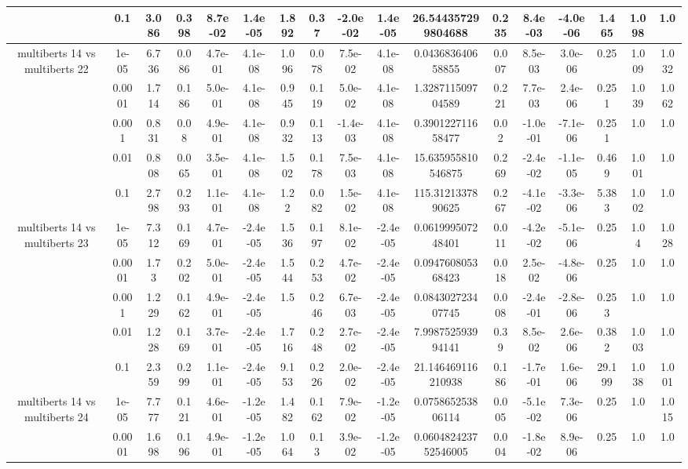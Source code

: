 \begin{tabular}{|c|c|c|c|c|c|c|c|c|c|c|c|c|c|c|c|c|}
 & 0.1 & 3.086 & 0.398 & 8.7e-02 & 1.4e-05 & 1.892 & 0.37 & -2.0e-02 & 1.4e-05 & 26.544357299804688 & 0.235 & 8.4e-03 & -4.0e-06 & 1.465 & 1.098 & 1.0 \\
\hline
\multirow{5}{*}{multiberts 14 vs multiberts 22} & 1e-05 & 6.736 & 0.086 & 4.7e-01 & 4.1e-08 & 1.096 & 0.078 & 7.5e-02 & 4.1e-08 & 0.043683640658855 & 0.007 & 8.5e-03 & 3.0e-06 & 0.25 & 1.009 & 1.032 \\
 & 0.0001 & 1.714 & 0.186 & 5.0e-01 & 4.1e-08 & 0.945 & 0.119 & 5.0e-02 & 4.1e-08 & 1.328711509704589 & 0.221 & 7.7e-03 & 2.4e-06 & 0.251 & 1.039 & 1.062 \\
 & 0.001 & 0.831 & 0.08 & 4.9e-01 & 4.1e-08 & 0.932 & 0.113 & -1.4e-03 & 4.1e-08 & 0.390122711658477 & 0.02 & -1.0e-01 & -7.1e-06 & 0.251 & 1.0 & 1.0 \\
 & 0.01 & 0.808 & 0.065 & 3.5e-01 & 4.1e-08 & 1.502 & 0.178 & 7.5e-03 & 4.1e-08 & 15.635955810546875 & 0.269 & -2.4e-02 & -1.1e-05 & 0.469 & 1.001 & 1.0 \\
 & 0.1 & 2.798 & 0.293 & 1.1e-01 & 4.1e-08 & 1.22 & 0.082 & 1.5e-02 & 4.1e-08 & 115.3121337890625 & 0.267 & -4.1e-02 & -3.3e-06 & 5.383 & 1.002 & 1.0 \\
\hline
\multirow{5}{*}{multiberts 14 vs multiberts 23} & 1e-05 & 7.312 & 0.169 & 4.7e-01 & -2.4e-05 & 1.536 & 0.197 & 8.1e-02 & -2.4e-05 & 0.061999507248401 & 0.011 & -4.2e-02 & -5.1e-06 & 0.25 & 1.04 & 1.028 \\
 & 0.0001 & 1.73 & 0.202 & 5.0e-01 & -2.4e-05 & 1.544 & 0.253 & 4.7e-02 & -2.4e-05 & 0.094760805368423 & 0.018 & 2.5e-02 & -4.8e-06 & 0.25 & 1.0 & 1.0 \\
 & 0.001 & 1.229 & 0.162 & 4.9e-01 & -2.4e-05 & 1.5 & 0.246 & 6.7e-03 & -2.4e-05 & 0.084302723407745 & 0.008 & -2.4e-01 & -2.8e-06 & 0.253 & 1.0 & 1.0 \\
 & 0.01 & 1.228 & 0.169 & 3.7e-01 & -2.4e-05 & 1.716 & 0.248 & 2.7e-02 & -2.4e-05 & 7.998752593994141 & 0.39 & 8.5e-02 & 2.6e-06 & 0.382 & 1.003 & 1.0 \\
 & 0.1 & 2.359 & 0.299 & 1.1e-01 & -2.4e-05 & 9.153 & 0.226 & 2.0e-02 & -2.4e-05 & 21.146469116210938 & 0.186 & -1.7e-01 & 1.6e-06 & 29.199 & 1.038 & 1.001 \\
\hline
\multirow{5}{*}{multiberts 14 vs multiberts 24} & 1e-05 & 7.777 & 0.121 & 4.6e-01 & -1.2e-05 & 1.482 & 0.162 & 7.9e-02 & -1.2e-05 & 0.075865253806114 & 0.005 & -5.1e-02 & 7.3e-06 & 0.25 & 1.0 & 1.015 \\
 & 0.0001 & 1.698 & 0.196 & 4.9e-01 & -1.2e-05 & 1.064 & 0.13 & 3.9e-02 & -1.2e-05 & 0.060482423752546005 & 0.004 & -1.8e-02 & 8.9e-06 & 0.25 & 1.0 & 1.0 \\

\end{tabular}
